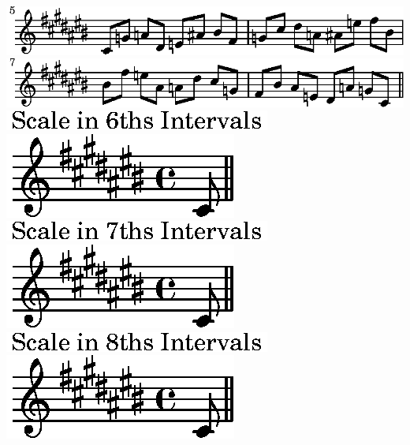 \ifx\betweenLilyPondSystem \undefined
  \linebreak
\else
  \expandafter{}%
\fi
\includegraphics{88/lily-44fe9253-22}%
\ifx\betweenLilyPondSystem \undefined
  \linebreak
\else
  \expandafter{}%
\fi
\includegraphics{88/lily-44fe9253-23}%
\ifx\betweenLilyPondSystem \undefined
  \linebreak
\else
  \expandafter{}%
\fi
\includegraphics{88/lily-44fe9253-24}%
\ifx\betweenLilyPondSystem \undefined
  \linebreak
\else
  \expandafter{}%
\fi
\includegraphics{88/lily-44fe9253-25}%
\ifx\betweenLilyPondSystem \undefined
  \linebreak
\else
  \expandafter{}%
\fi
\includegraphics{88/lily-44fe9253-26}%
\ifx\betweenLilyPondSystem \undefined
  \linebreak
\else
  \expandafter{}%
\fi
\includegraphics{88/lily-44fe9253-27}%
\ifx\betweenLilyPondSystem \undefined
  \linebreak
\else
  \expandafter{}%
\fi
\includegraphics{88/lily-44fe9253-28}%
\ifx\betweenLilyPondSystem \undefined
  \linebreak
\else
  \expandafter{}%
\fi
\includegraphics{88/lily-44fe9253-29}%
